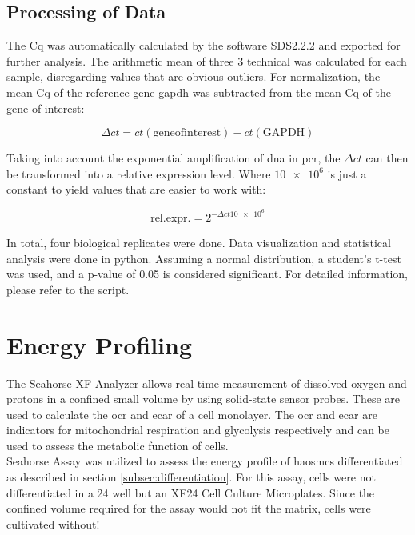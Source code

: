     \subsection{Processing of Data}
    The \ac{Cq} was automatically calculated by the software SDS2.2.2 and exported for further analysis. The arithmetic mean of three 3 technical was calculated for each sample, disregarding values that are obvious outliers. For normalization, the mean \ac{Cq} of the reference gene \ac{gapdh} was subtracted from the mean \ac{Cq} of the gene of interest:

    $$\Delta ct = ct(\mathrm{gene of interest}) - ct(\mathrm{GAPDH})$$

    Taking into account the exponential amplification of \ac{dna} in \ac{pcr}, the $\Delta ct$ can then be transformed into a relative expression level. Where $\num{10e6}$ is just a constant to yield values that are easier to work with:

    $$\mathrm{rel. expr.} = 2^{-\Delta ct\num{10e6}}$$

    In total, four biological replicates were done. Data visualization and statistical analysis were done in python. Assuming a normal distribution, a student's t-test was used, and a p-value of 0.05 is considered significant. For detailed information, please refer to the script.

\section{Energy Profiling}
\label{sec:seahorse}
The Seahorse XF Analyzer allows real-time measurement of dissolved oxygen and protons in a confined small volume by using solid-state sensor probes. These are used to calculate the \ac{ocr} and \ac{ecar} of a cell monolayer. The \ac{ocr} and \ac{ecar} are indicators for mitochondrial respiration and glycolysis respectively and can be used to assess the metabolic function of cells. \cite{agilenttechnologiesHowAgilentSeahorse2022}\\
Seahorse Assay was utilized to assess the energy profile of \acp{haosmc} differentiated as described in section \ref{subsec:differentiation}. For this assay, cells were not differentiated in a \ac{24 well} but an XF24 Cell Culture Microplates. Since the confined volume required for the assay would not fit the matrix, cells were cultivated without!

